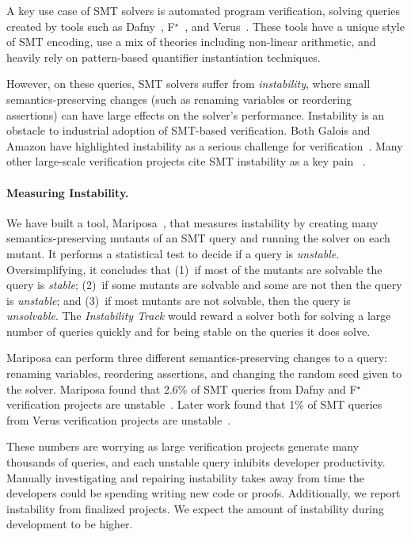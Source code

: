 \documentclass[
]{ceurart}
\newcommand{\fstar}{F${}^\star$\xspace}
\begin{document}
A key use case of SMT solvers is automated program verification, solving queries
created by tools such as Dafny~\cite{dafny}, \fstar~\cite{fstar}, and Verus~\cite{verus-ghost}. These tools
have a unique style of SMT encoding, use a mix of theories including non-linear
arithmetic, and heavily rely on pattern-based quantifier instantiation
techniques.

However, on these queries, SMT solvers suffer from \emph{instability}, where
small semantics-preserving changes (such as renaming variables or reordering
assertions) can have large effects on the solver's performance. Instability is
an obstacle to industrial adoption of SMT-based verification. Both Galois and
Amazon have highlighted instability as a serious challenge for
verification~\cite{saw-stable,amazon-billion-queries}. Many other large-scale
verification projects cite SMT instability as a key pain
~\cite{Zelkova,amazon-cloudscale,cedar,komodo,ironclad,verus-sys,starmalloc}.


\paragraph{Measuring Instability.} We have built a tool,
Mariposa~\cite{mariposa}, that measures instability by creating many
semantics-preserving mutants of an SMT query and running the solver on each
mutant. It performs a statistical test to decide if a query is \emph{unstable}.
Oversimplifying, it concludes that (1)~if most of the mutants are solvable the
query is \emph{stable}; (2)~if some mutants are solvable and some are not then
the query is \emph{unstable}; and (3)~if most mutants are not solvable, then the
query is \emph{unsolvable}. The \emph{Instability Track} would reward a solver
both for solving a large number of queries quickly and for being stable on the
queries it does solve.

Mariposa can perform three different semantics-preserving changes to a query: renaming variables, reordering assertions, and changing the random seed given to the solver. Mariposa found that 2.6\% of SMT queries from Dafny and \fstar verification projects are unstable~\cite{mariposa}. Later work found that 1\% of SMT queries from Verus verification projects are unstable~\cite{cazamariposas}. 

These numbers are worrying as large verification projects generate many thousands of queries, and each unstable query inhibits developer productivity. Manually investigating and repairing instability takes away from time the developers could be spending writing new code or proofs. Additionally, we report instability from finalized projects. We expect the amount of instability during development to be higher.
\end{document}

